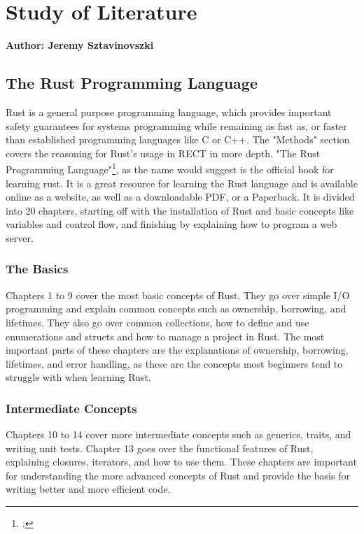 \chapter{Study of Literature}
\textbf{Author: Jeremy Sztavinovszki} 

\section{The Rust Programming Language}
Rust is a general purpose programming language, which provides important safety guarantees for systems programming while remaining as fast as, or faster than established programming languages
like C or C++. The "Methods" section covers the reasoning for Rust's usage in RECT in more depth. "The Rust Programming Language"\footcite{the-rust-programming-language}, as the name would suggest is the official book for learning rust. It is a great resource for learning the Rust language
and is available online as a website, as well as a downloadable PDF, or a Paperback. It is divided into 20 chapters, starting off with the installation
of Rust and basic concepts like variables and control flow, and finishing by explaining how to program a web server.

\subsection{The Basics}
Chapters 1 to 9 cover the most basic concepts of Rust. They go over simple I/O programming and explain common concepts such as ownership, borrowing, and lifetimes.
They also go over common collections, how to define and use enumerations and structs and how to manage a project in Rust. The most important parts of these chapters
are the explanations of ownership, borrowing, lifetimes, and error handling, as these are the concepts most beginners tend to struggle with when learning Rust.

\subsection{Intermediate Concepts}
Chapters 10 to 14 cover more intermediate concepts such as generics, traits, and writing unit tests. Chapter 13 goes over the functional features of Rust, explaining
closures, iterators, and how to use them. These chapters are important for understanding the more advanced concepts of Rust and provide the basis for writing better
and more efficient code.

